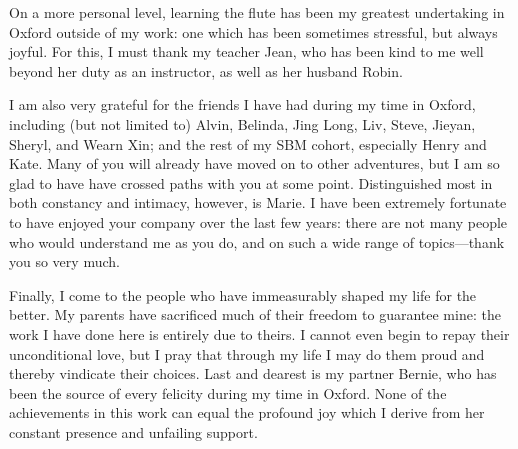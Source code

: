 On a more personal level, learning the flute has been my greatest undertaking in Oxford outside of my work: one which has been sometimes stressful, but always joyful.
For this, I must thank my teacher Jean, who has been kind to me well beyond her duty as an instructor, as well as her husband Robin.

I am also very grateful for the friends I have had during my time in Oxford, including (but not limited to) Alvin, Belinda, Jing Long, Liv, Steve, Jieyan, Sheryl, and Wearn Xin; and the rest of my SBM cohort, especially Henry and Kate.
Many of you will already have moved on to other adventures, but I am so glad to have have crossed paths with you at some point.
Distinguished most in both constancy and intimacy, however, is Marie.
I have been extremely fortunate to have enjoyed your company over the last few years:
there are not many people who would understand me as you do, and on such a wide range of topics---thank you so very much.

Finally, I come to the people who have immeasurably shaped my life for the better.
My parents have sacrificed much of their freedom to guarantee mine: the work I have done here is entirely due to theirs.
I cannot even begin to repay their unconditional love, but I pray that through my life I may do them proud and thereby vindicate their choices.
Last and dearest is my partner Bernie, who has been the source of every felicity during my time in Oxford.
None of the achievements in this work can equal the profound joy which I derive from her constant presence and unfailing support.
